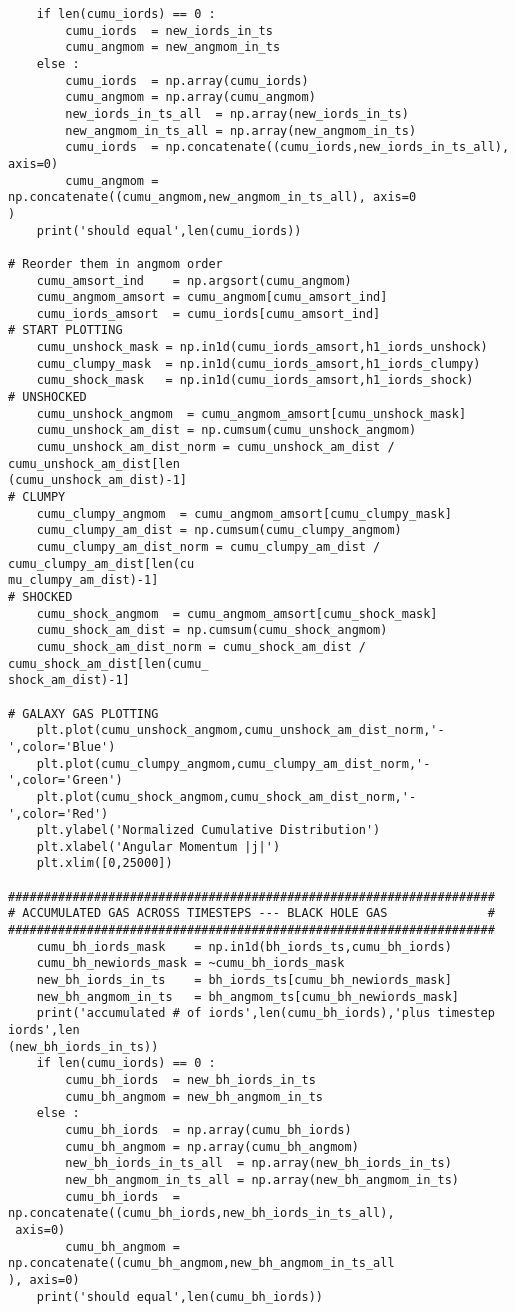\documentclass[12pt,headA,chapB]{fiskthesis}
\begin{document}
\begin{verbatim}
    if len(cumu_iords) == 0 :
        cumu_iords  = new_iords_in_ts
        cumu_angmom = new_angmom_in_ts
    else :    
        cumu_iords  = np.array(cumu_iords)
        cumu_angmom = np.array(cumu_angmom)
        new_iords_in_ts_all  = np.array(new_iords_in_ts)
        new_angmom_in_ts_all = np.array(new_angmom_in_ts)
        cumu_iords  = np.concatenate((cumu_iords,new_iords_in_ts_all), axis=0)
        cumu_angmom = np.concatenate((cumu_angmom,new_angmom_in_ts_all), axis=0
)
    print('should equal',len(cumu_iords))

# Reorder them in angmom order
    cumu_amsort_ind    = np.argsort(cumu_angmom)
    cumu_angmom_amsort = cumu_angmom[cumu_amsort_ind]
    cumu_iords_amsort  = cumu_iords[cumu_amsort_ind]
# START PLOTTING
    cumu_unshock_mask = np.in1d(cumu_iords_amsort,h1_iords_unshock)
    cumu_clumpy_mask  = np.in1d(cumu_iords_amsort,h1_iords_clumpy)
    cumu_shock_mask   = np.in1d(cumu_iords_amsort,h1_iords_shock)
# UNSHOCKED
    cumu_unshock_angmom  = cumu_angmom_amsort[cumu_unshock_mask]
    cumu_unshock_am_dist = np.cumsum(cumu_unshock_angmom)
    cumu_unshock_am_dist_norm = cumu_unshock_am_dist / cumu_unshock_am_dist[len
(cumu_unshock_am_dist)-1]
# CLUMPY
    cumu_clumpy_angmom  = cumu_angmom_amsort[cumu_clumpy_mask]
    cumu_clumpy_am_dist = np.cumsum(cumu_clumpy_angmom)
    cumu_clumpy_am_dist_norm = cumu_clumpy_am_dist / cumu_clumpy_am_dist[len(cu
mu_clumpy_am_dist)-1]
# SHOCKED
    cumu_shock_angmom  = cumu_angmom_amsort[cumu_shock_mask]
    cumu_shock_am_dist = np.cumsum(cumu_shock_angmom)
    cumu_shock_am_dist_norm = cumu_shock_am_dist / cumu_shock_am_dist[len(cumu_
shock_am_dist)-1]

# GALAXY GAS PLOTTING
    plt.plot(cumu_unshock_angmom,cumu_unshock_am_dist_norm,'-',color='Blue')
    plt.plot(cumu_clumpy_angmom,cumu_clumpy_am_dist_norm,'-',color='Green')
    plt.plot(cumu_shock_angmom,cumu_shock_am_dist_norm,'-',color='Red')
    plt.ylabel('Normalized Cumulative Distribution')
    plt.xlabel('Angular Momentum |j|')
    plt.xlim([0,25000])

####################################################################
# ACCUMULATED GAS ACROSS TIMESTEPS --- BLACK HOLE GAS              #
####################################################################
    cumu_bh_iords_mask    = np.in1d(bh_iords_ts,cumu_bh_iords)
    cumu_bh_newiords_mask = ~cumu_bh_iords_mask
    new_bh_iords_in_ts    = bh_iords_ts[cumu_bh_newiords_mask]
    new_bh_angmom_in_ts   = bh_angmom_ts[cumu_bh_newiords_mask]
    print('accumulated # of iords',len(cumu_bh_iords),'plus timestep iords',len
(new_bh_iords_in_ts))
    if len(cumu_iords) == 0 :
        cumu_bh_iords  = new_bh_iords_in_ts
        cumu_bh_angmom = new_bh_angmom_in_ts
    else :
        cumu_bh_iords  = np.array(cumu_bh_iords)
        cumu_bh_angmom = np.array(cumu_bh_angmom)
        new_bh_iords_in_ts_all  = np.array(new_bh_iords_in_ts)
        new_bh_angmom_in_ts_all = np.array(new_bh_angmom_in_ts)
        cumu_bh_iords  = np.concatenate((cumu_bh_iords,new_bh_iords_in_ts_all),
 axis=0)
        cumu_bh_angmom = np.concatenate((cumu_bh_angmom,new_bh_angmom_in_ts_all
), axis=0)
    print('should equal',len(cumu_bh_iords))


\end{verbatim}
\end{document}
